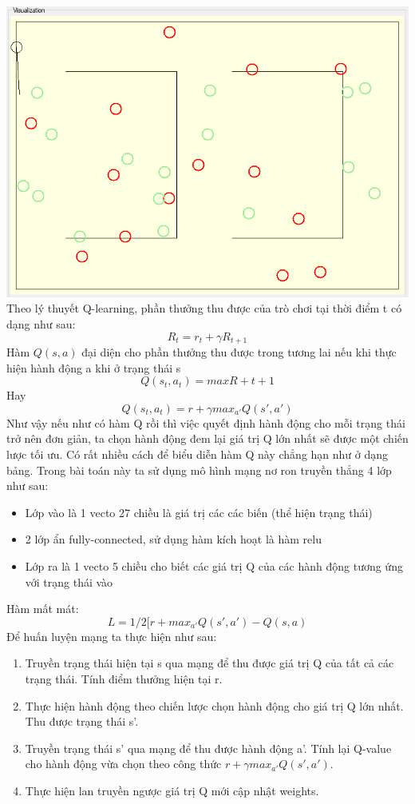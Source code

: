 \documentclass[14pt,a4paper,oneside]{report}		%
\begin{document}
\includegraphics[width=\textwidth,height=\textheight,keepaspectratio]{6.png}
\\
Theo lý thuyết Q-learning, phần thưởng thu được của trò chơi tại thời điểm t có dạng như sau: $$R_t = r_t+\gamma R_{t+1}$$
Hàm $Q(s,a)$ đại diện cho phần thưởng thu được trong tương lai nếu khi thực hiện hành động a khi ở trạng thái s 
$$Q(s_t,a_t) = maxR+t+1$$
Hay 
$$Q(s_t,a_t) = r + \gamma max_{a'}Q(s',a')$$
Như vậy nếu như có hàm Q rồi thì việc quyết định hành động cho mỗi trạng thái trở nên đơn giản, ta chọn hành động đem lại giá trị Q lớn nhất sẽ được một chiến lược tối ưu. Có rất nhiều cách để biểu diễn hàm Q này chẳng hạn như ở dạng bảng. Trong bài toán này ta sử dụng mô hình mạng nơ ron truyền thẳng 4 lớp như sau:
\begin{itemize}
\item Lớp vào là 1 vecto 27 chiều là giá trị các các biến (thể hiện trạng thái)
\item 2 lớp ẩn fully-connected, sử dụng hàm kích hoạt là hàm relu
\item Lớp ra là 1 vecto 5 chiều cho biết các giá trị Q của các hành động tương ứng với trạng thái vào
\end{itemize}
Hàm mất mát:
$$L=1/2[r+max_{a'}Q(s',a')-Q(s,a)$$
Để huấn luyện mạng ta thực hiện như sau:
\begin{enumerate}
\item Truyền trạng thái hiện tại s qua mạng để thu được giá trị Q của tất cả các trạng thái. Tính điểm thưởng hiện tại r.
\item Thực hiện hành động theo chiến lược chọn hành động cho giá trị Q lớn nhất. Thu được trạng thái s'.
\item Truyền trạng thái s' qua mạng để thu được hành động a'. Tính lại Q-value cho hành động vừa chọn theo công thức $r+\gamma max_{a'}Q(s',a')$.
\item Thực hiện lan truyền ngược giá trị Q mới cập nhật weights.
\end{enumerate}
\end{document}
